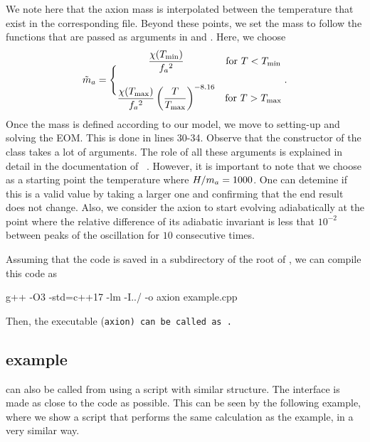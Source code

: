 \documentclass[a4paper,11pt]{article}
\begin{document}
	\lstset{language = c++}
	
	
	
	We note here that the axion mass is interpolated between the temperature that exist in the corresponding file. Beyond these points, we set the mass to follow the functions
	that are passed as arguments in  and .  Here, we choose
	\begin{equation}
		\tilde m_{a}{} = \Bigg\{
		\begin{matrix}
			\dfrac{\chi(T_{\rm min})}{f_{a}{}^2} & \text{for } T<T_{\rm min} 
			\\ \\
			\dfrac{\chi(T_{\rm max})}{f_{a}{}^2}   \left( \dfrac{T}{T_{\rm max}} \right)^{-8.16} & \text{for } T>T_{\rm max} 
		\end{matrix} \;.
		\label{eq:axM-limits}
	\end{equation}
	Once the mass is defined according to our model, we move to setting-up and solving the EOM. This is done in lines 30-34. Observe that the constructor of the  class takes a lot of arguments. The role of all these arguments is explained in detail in the documentation of \mimes~\cite{Karamitros:2021nxi}. However, it is important to note that we choose as a starting point the temperature where $H/m_{a}{} = 1000$. One can detemine if this is a valid value by taking a larger one and confirming that the end result does not change.
	 Also, we consider the axion to start evolving adiabatically at the point where the relative difference of its adiabatic invariant is less that $10^{-2}$ between peaks of the oscillation for $10$ consecutive times.
	 
	 Assuming that the code is saved in a subdirectory of the root of \mimes, we can compile this code as 
	 \begin{bash}
	 	g++ -O3 -std=c++17 -lm -I../ -o axion example.cpp
	 \end{bash}
	Then, the executable (\tt{axion}) can be called as .
	
	
	\subsection{\PY example}
	\mimes can also be called from \PY using a script with similar structure. The \PY interface is made as close to the \CPP code as possible. This can be seen by the following example, where 
	we show a \PY script that performs the same calculation as the \CPP example, in a very similar way.
	
\end{document}
